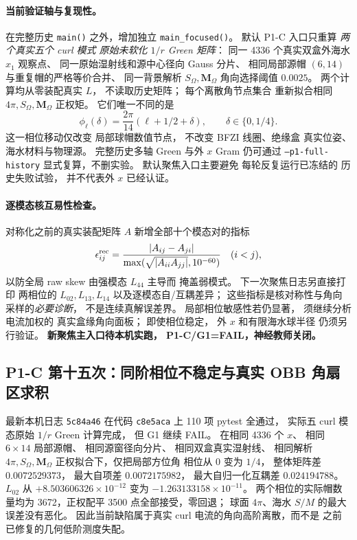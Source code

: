 \paragraph{当前验证轴与复现性。}
在完整历史 \texttt{main()}
之外，增加独立
\texttt{main\_focused()}。
默认 P1-C 入口只重算
\emph{两个真实五个 curl 模式
原始未软化 $1/r$ Green 矩阵}：
同一 4336 个真实双盒外海水
$x_1$ 观察点、
同一原始湿射线和源中心径向
Gauss 分片、
相同局部源帽 $(6,14)$
与重复帽的严格等价合并、
同一背景解析
$S_\Omega,\bm M_\Omega$
角向选择阈值 $0.0025$。
两个计算均从零装配真实 $L$，
不读取历史矩阵；
每个离散角节点集合
重新拟合相同
$4\pi,S_\Omega,\bm M_\Omega$
正权矩。
它们唯一不同的是
\[
 \phi_\ell(\delta)=
 \frac{2\pi}{14}(\ell+1/2+\delta),
 \qquad
 \delta\in\{0,1/4\}.
\]
这一相位移动仅改变
局部球帽数值节点，
不改变 BFZI 线圈、绝缘盒
真实位姿、海水材料与物理源。
完整历史多轴
Green 与外 $x$ Gram
仍可通过
\texttt{--p1-full-history}
显式复算，不删实验。
默认聚焦入口主要避免
每轮反复运行已冻结的
历史失败试验，
并不代表外 $x$ 已经认证。

\paragraph{逐模态核互易性检查。}
对称化之前的真实装配矩阵 $A$
新增全部十个模态对的指标
\[
 \epsilon_{ij}^{\rm rec}=
 \frac{|A_{ij}-A_{ji}|}
 {\max(\sqrt{|A_{ii}A_{jj}|},10^{-60})}
 \quad(i<j),
\]
以防全局 raw skew
由强模态 $L_{44}$ 主导而
掩盖弱模式。
下一次聚焦日志另直接打印
两相位的
$L_{02},L_{13},L_{14}$
以及逐模态自/互耦差异；
这些指标是核对称性与角向
采样的\emph{必要诊断}，
不是连续真解误差界。
局部相位敏感性若仍显著，
须继续分析电流加权的
真实盒缘角向面板；
即使相位稳定，
外 $x$ 和有限海水球半径
仍须另行验证。
\textbf{新聚焦主入口待本机实跑，
P1-C/G1=FAIL，神经教师关闭。}


\subsection{P1-C 第十五次：同阶相位不稳定与真实 OBB 角扇区求积}
\label{sec:p1-c-cap-true-obb-corner-azimuth}

最新本机日志 \texttt{5c84a46}
在代码 \texttt{c8e5aca} 上
110 项 pytest 全通过，
实际五 curl 模态原始
$1/r$ Green 计算完成，
但 G1 继续 FAIL。
在相同 4336 个 $x$、
相同 $6\times14$ 局部源帽、
相同源窗径向分片、
相同双盒真实湿射线、
相同解析 $4\pi,S_\Omega,\bm M_\Omega$
正权拟合下，仅把局部方位角
相位从 0 变为 $1/4$，
整体矩阵差 $0.0072529373$，
最大自项差 $0.0072175982$，
最大自归一化互耦差
$0.024194788$。
$L_{02}$ 从
$+8.503606326\times10^{-12}$
变为
$-1.263133158\times10^{-11}$。
两个相位的实际帽数量均为
3672，正权配平 3500
点全部接受，零回退；
球面 $4\pi$、海水
$S/M$ 的最大误差没有恶化。
因此当前缺陷属于真实 curl
电流的角向高阶离散，而不是
之前已修复的几何低阶测度失配。


